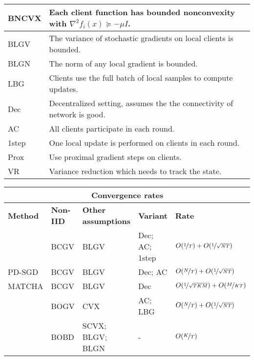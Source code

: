 \begin{table}
\begin{center}
\begin{tabularx}{\textwidth}{lX}
  BNCVX & Each client function has bounded nonconvexity with $\nabla^2 f_i(x) \succeq -\mu I $. \\
  \hline
  BLGV & The variance of stochastic gradients on local clients is bounded. \\
  BLGN & The norm of any local gradient is bounded. \\
  LBG & Clients use the full batch of local samples to compute updates. \\
  \hline
  Dec & Decentralized setting, assumes the the connectivity of network is good. \\
  AC & All clients participate in each round. \\
  1step & One local update is performed on clients in each round. \\
  Prox & Use proximal gradient steps on clients. \\
  VR & Variance reduction which needs to track the state. \\
\bottomrule
\end{tabularx}
\vspace{0.5cm}
\begin{tabularx}{\textwidth}{llllX}
\multicolumn{5}{c}{\textbf{Convergence rates}}\\
\toprule
\textbf{Method} & \textbf{Non-IID} & \textbf{Other assumptions} & \textbf{Variant} & \textbf{Rate} \\
\midrule
\citet{Lian2017b} & BCGV  &  BLGV &  Dec; AC; 1step & $O(\nicefrac{1}{T}) + O(\nicefrac{1}{\sqrt{NT}})$\\
\hline
PD-SGD \citep{li2019communication} & BCGV & BLGV & Dec; AC & $O(\nicefrac{N}{T}) + O(\nicefrac{1}{\sqrt{NT}})$ \\
\hline
MATCHA \citep{wang2019matcha} & BCGV & BLGV & Dec & $O(\nicefrac{1}{\sqrt{TKM}}) + O(\nicefrac{M}{KT})$ \\
\hline
\citet{khaled2019analysis} &  BOGV   & CVX & AC; LBG & $O(\nicefrac{N}{T}) + O(\nicefrac{1}{\sqrt{NT}})$\\
\hline
\citet{li2019convergence} & BOBD & SCVX; BLGV; BLGN & - & $O(\nicefrac{K}{T})$\\
\hline

\end{tabularx}
\end{center}
\end{table}
